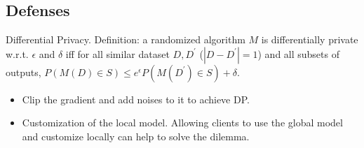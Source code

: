 \subsection*{Defenses}

Differential Privacy. Definition: a randomized algorithm $M$ is differentially private w.r.t. $\epsilon$ and $\delta$ iff for all similar dataset $D, D^\prime$ ($|D-D^\prime|=1$) and all subsets of outputs, $P(M(D)\in S) \le e^\epsilon P(M(D^\prime)\in S)+\delta$.

\begin{itemize}
    \item Clip the gradient and add noises to it to achieve DP.
    \item Customization of the local model. Allowing clients to use the global model and customize locally can help to solve the dilemma.
\end{itemize}